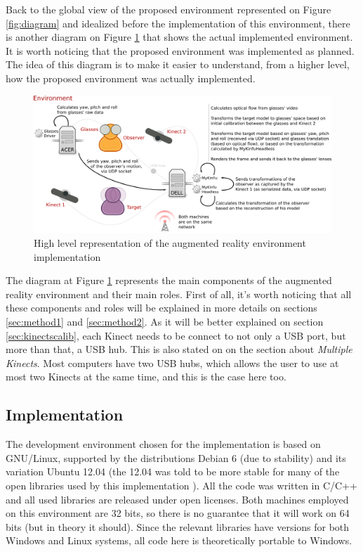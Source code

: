 \documentclass[msc, a4paper, classic, en]{ufbathesis}
\begin{document}
Back to the global view of the proposed environment represented on Figure \ref{fig:diagram} and idealized before the implementation of this environment, there is another diagram on Figure \ref{fig:env} that shows the actual implemented environment. It is worth noticing that the proposed environment was implemented as planned. The idea of this diagram is to make it easier to understand, from a higher level, how the proposed environment was actually implemented.

\begin{figure}
\centering
\includegraphics[width=1\textwidth]{images/env.png}
\caption{High level representation of the augmented reality environment implementation}
\label{fig:env}
\end{figure}

The diagram at Figure \ref{fig:env} represents the main components of the augmented reality environment and their main roles. First of all, it's worth noticing that all these components and roles will be explained in more details on sections \ref{sec:method1} and \ref{sec:method2}. As it will be better explained on section \ref{sec:kinectscalib}, each Kinect needs to be connect to not only a USB port, but more than that, a USB hub. This is also stated on \cite{kinecthacks} on the section about \textit{Multiple Kinects}. Most computers have two USB hubs, which allows the user to use at most two Kinects at the same time, and this is the case here too. \subsection{Implementation}

The development environment chosen for the implementation is based on GNU/Linux, supported by the distributions Debian 6 (due to stability) and its variation Ubuntu 12.04 (the 12.04 was told to be more stable for many of the open libraries used by this implementation \cite{pcl14}). All the code was written in C/C++ and all used libraries are released under open licenses. Both machines employed on this environment are 32 bits, so there is no guarantee that it will work on 64 bits (but in theory it should). Since the relevant libraries have versions for both Windows and Linux systems, all code here is theoretically portable to Windows.
\end{document}
